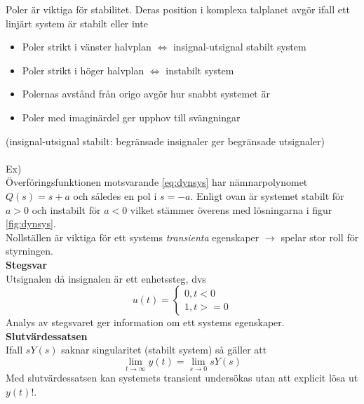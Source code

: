 \documentclass[12pt]{article}
\begin{document}

Poler är viktiga för stabilitet. Deras position i komplexa talplanet avgör ifall ett linjärt system är stabilt eller inte
\begin{itemize}
\item Poler strikt i vänster halvplan $\Leftrightarrow$ insignal-utsignal stabilt system
\item Poler strikt i höger halvplan $\Leftrightarrow$ instabilt system
\item Polernas avstånd från origo avgör hur snabbt systemet är 
\item Poler med imaginärdel ger upphov till svängningar
\end{itemize}
(insignal-utsignal stabilt: begränsade insignaler ger begränsade utsignaler) \\\\
Ex) \\
Överföringsfunktionen motsvarande \eqref{eq:dynsys} har nämnarpolynomet $Q(s) = s+a$ och således en pol i $s = -a$. Enligt ovan är systemet stabilt för $a > 0$ och instabilt för $a < 0$ vilket stämmer överens med lösningarna i figur \ref{fig:dynsys}. \\

Nollställen är viktiga för ett systems \textit{transienta} egenskaper $\rightarrow$ spelar stor roll för styrningen. \\

\textbf{Stegsvar} \\
Utsignalen då insignalen är ett enhetssteg, dvs
\begin{equation*}
  u(t) = \begin{cases}
0, t < 0 \\
1, t >= 0
\end{cases}
\end{equation*}
Analys av stegsvaret ger information om ett systems egenskaper. \\

\textbf{Slutvärdessatsen} \\
Ifall $sY(s)$ saknar singularitet (stabilt system) så gäller att
\begin{equation}
  \label{eq:fvtheorem}
  \lim_{t \to \infty}y(t) = \lim_{s \to 0}sY(s)
\end{equation}
Med slutvärdessatsen kan systemets transient undersökas utan att explicit lösa ut $y(t)$!. \\
\end{document}
